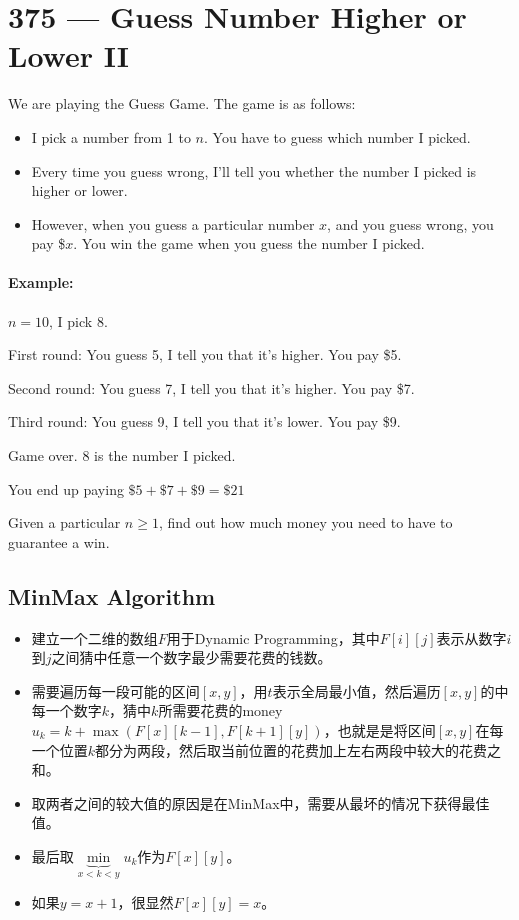 \section{375 --- Guess Number Higher or Lower II}
We are playing the Guess Game. The game is as follows:

\begin{itemize}
\item I pick a number from 1 to $ n $. You have to guess which number I picked.

\item Every time you guess wrong, I'll tell you whether the number I picked is higher or lower.

\item However, when you guess a particular number $ x $, and you guess wrong, you pay \$$x$. You win the game when you guess the number I picked.
\end{itemize}

\paragraph{Example:}

\begin{flushleft}
$ n = 10 $, I pick 8.

First round:  You guess 5, I tell you that it's higher. You pay \$5.

Second round: You guess 7, I tell you that it's higher. You pay \$7.

Third round:  You guess 9, I tell you that it's lower. You pay \$9.

Game over. 8 is the number I picked.

You end up paying $\$5 + \$7 + \$9 = \$21$
\end{flushleft}

Given a particular $n \geq 1$, find out how much money you need to have to guarantee a win.

\subsection{MinMax Algorithm}
\begin{itemize}
\item 建立一个二维的数组$F$用于Dynamic Programming，其中$F[i][j]$表示从数字$i$到$j$之间猜中任意一个数字最少需要花费的钱数。
\item 需要遍历每一段可能的区间$[x, y]$，用$t$表示全局最小值，然后遍历$ [x,y] $的中每一个数字$k$，猜中$k$所需要花费的money $u_k = k + \max(F[x][k - 1], F[k + 1][y])$，也就是是将区间$ [x,y] $在每一个位置$k$都分为两段，然后取当前位置的花费加上左右两段中较大的花费之和。
\item 取两者之间的较大值的原因是在MinMax中，需要从最坏的情况下获得最佳值。
\item 最后取$\underbrace{\min}_{x< k < y}u_k$作为$F[x][y]$。
\item 如果$y=x+1$，很显然$F[x][y]=x$。
\end{itemize}


